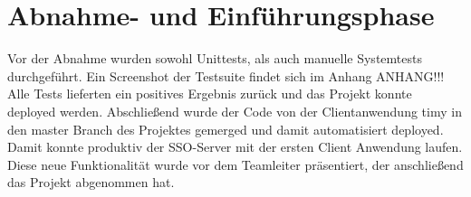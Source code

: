 \section{Abnahme- und Einführungsphase} 
\label{sec:AbnahmeEinfuehrung}

Vor der Abnahme wurden sowohl Unittests, als auch manuelle Systemtests durchgeführt. Ein Screenshot der Testsuite findet sich im Anhang ANHANG!!!
Alle Tests  lieferten ein positives Ergebnis zurück und das Projekt konnte deployed werden.
Abschließend wurde der Code von der Clientanwendung timy in den master Branch des Projektes gemerged und damit automatisiert deployed. 
Damit konnte produktiv der SSO-Server mit der ersten Client Anwendung laufen. 
Diese neue Funktionalität wurde vor dem Teamleiter präsentiert, der anschließend das Projekt abgenommen hat.

